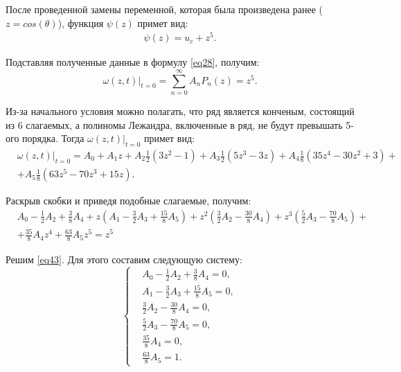 {{     После проведенной замены переменной, которая была произведена ранее ($z = cos(\theta)$), функция $\psi(z)$ примет вид: 
    \begin{align*}
        \psi(z) = u_c + z^5.
    \end{align*}
    
    Подставляя полученные данные в формулу \eqref{eq28}, получим:    
    \begin{equation}
      \omega(z,t)|_{t=0} = \sum_{n=0}^{\infty}{A_n P_n(z)} = z^5.
    \end{equation}
    
    	 Из-за начального условия можно полагать, что ряд является конченым, состоящий из 6 слагаемых, 
а полиномы Лежандра, включенные в ряд, не будут превышать 5-ого порядка.
    Тогда $\omega(z, t)|_{t=0}$ примет вид:
    \begin{align}
        &\omega(z, t)|_{t=0} =  A_0 + A_1 z + A_2 \frac{1}{2}(3z^2-1) + A_3 \frac{1}{2}(5z^3-3z) 
        + A_4 \frac{1}{8}(35z^4-30z^2+3) + \nonumber\\
         &  +  A_5 \frac{1}{8}(63z^5-70z^3+15z).
    \end{align}
    
    
    
    Раскрыв скобки и приведя подобные слагаемые, получим:
    \begin{align}\label{eq43}
        &A_0 - \frac{1}{2}A_2 + \frac{3}{8}A_4 + z(A_1 - \frac{3}{2}A_3 + \frac{15}{8}A_5) + z^2(\frac{3}{2}A_2 - \frac{30}{8}A_4) +
        z^3 ( \frac{5}{2}A_3 - \frac{70}{8}A_5) + \nonumber\\
          &+ \frac{35}{8} A_4 z^4 + \frac{63}{8} A_5 z^5 = z^5
    \end{align}
    
    Решим \eqref{eq43}. Для этого составим следующую систему:
    \begin{equation}\label{eq44}
    \left\{
    \begin{split}
     &A_0 - \frac{1}{2}A_2 + \frac{3}{8}A_4  = 0, \\
     &A_1 - \frac{3}{2}A_3 + \frac{15}{8}A_5 = 0, \\
     &\frac{3}{2}A_2 - \frac{30}{8}A_4 = 0, \\
     & \frac{5}{2}A_3 - \frac{70}{8}A_5 = 0, \\
     &\frac{35}{8} A_4 = 0, \\
     &\frac{63}{8} A_5 = 1.
    \end{split}
    \right.
    \end{equation} 
    
}}

